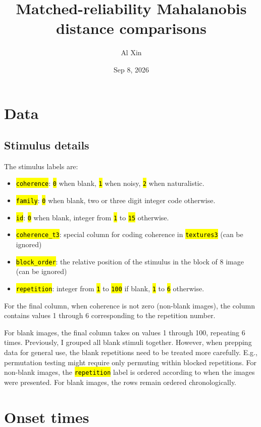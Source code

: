 \documentclass[
  10pt,
  letterpaper,
  DIV=11,
  numbers=noendperiod]{scrartcl}
\title{Matched-reliability Mahalanobis distance comparisons}
\author{Al Xin}
\date{Sep 8, 2026}
\providecommand{\tightlist}{%
  \setlength{\itemsep}{0pt}\setlength{\parskip}{0pt}}
\let\OldTexttt\texttt
\renewcommand{\texttt}[1]{\OldTexttt{\hl{#1}}}
\begin{document}
\maketitle


\section{Data}\label{data}

\subsection{Stimulus details}\label{stimulus-details}

The stimulus labels are:

\begin{itemize}
\tightlist
\item
  \texttt{coherence}: \texttt{0} when blank, \texttt{1} when noisy,
  \texttt{2} when naturalistic.
\item
  \texttt{family}: \texttt{0} when blank, two or three digit integer
  code otherwise.
\item
  \texttt{id}: \texttt{0} when blank, integer from \texttt{1} to
  \texttt{15} otherwise.
\item
  \texttt{coherence\_t3}: special column for coding coherence in
  \texttt{textures3} (can be ignored)
\item
  \texttt{block\_order}: the relative position of the stimulus in the
  block of 8 image (can be ignored)
\item
  \texttt{repetition}: integer from \texttt{1} to \texttt{100} if blank,
  \texttt{1} to \texttt{6} otherwise.
\end{itemize}

For the final column, when coherence is not zero (non-blank images), the
column contains values 1 through 6 corresponding to the repetition
number.

For blank images, the final column takes on values 1 through 100,
repeating 6 times. Previously, I grouped all blank stimuli together.
However, when prepping data for general use, the blank repetitions need
to be treated more carefully. E.g., permutation testing might require
only permuting within blocked repetitions. For non-blank images, the
\texttt{repetition} label is ordered according to when the images were
presented. For blank images, the rows remain ordered chronologically.

\section{Onset times}\label{onset-times}
\end{document}

